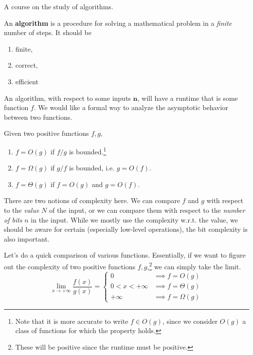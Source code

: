\documentclass{article}
\begin{document}
  A course on the study of algorithms. 

  \begin{definition}[Algorithm]
    An \textbf{algorithm} is a procedure for solving a mathematical problem in a \textit{finite} number of steps. It should be 
    \begin{enumerate}
      \item finite, 
      \item correct,
      \item efficient
    \end{enumerate}
  \end{definition}

  An algorithm, with respect to some inputs $\mathbf{n}$, will have a runtime that is some function $f$. We would like a formal way to analyze the asymptotic behavior between two functions. 

  \begin{definition}[Complexity]
    Given two positive functions $f, g$, 
    \begin{enumerate}
      \item $f = O(g)$ if $f/g$ is bounded.\footnote{Note that it is more accurate to write $f \in O(g)$, since we consider $O(g)$ a class of functions for which the property holds.} 
      \item $f = \Omega(g)$ if $g/f$ is bounded, i.e. $g = O(f)$. 
      \item $f = \Theta (g)$ if $f = O(g)$ and $g = O(f)$. 
    \end{enumerate}
  \end{definition}

  There are two notions of complexity here. We can compare $f$ and $g$ with respect to the \textit{value} $N$ of the input, or we can compare them with respect to the \textit{number of bits} $n$ in the input. While we mostly use the complexity w.r.t. the value, we should be aware for certain (especially low-level operations), the bit complexity is also important. 

  Let's do a quick comparison of various functions. Essentially, if we want to figure out the complexity of two positive functions $f, g$,\footnote{These will be positive since the runtime must be positive.} we can simply take the limit. 
  \begin{equation}
    \lim_{x \rightarrow +\infty} \frac{f(x)}{g(x)} = \begin{cases} 
      0 & \implies f = O(g) \\
      0 < x < +\infty & \implies f = \Theta(g) \\
      +\infty & \implies f = \Omega(g)
    \end{cases}
  \end{equation} 
\end{document}
